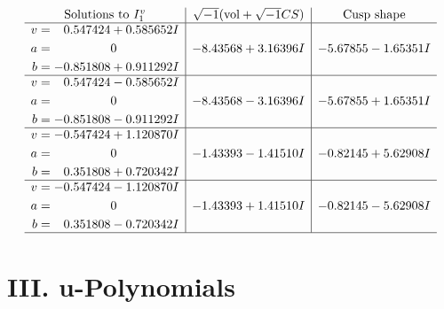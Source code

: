 \documentclass[1p]{elsarticle_modified}
\theoremstyle{definition}
\newcommand{\I}{\sqrt{-1}}
\begin{document}
$$\begin{array}{c|c|c}  
\text{Solutions to }I^v_{1}& \I (\text{vol} + \sqrt{-1}CS) & \text{Cusp shape}\\
 \hline 
\begin{aligned}
v &= \phantom{-}0.547424 + 0.585652 I \\
a &= \phantom{-0.000000 } 0 \\
b &= -0.851808 + 0.911292 I\end{aligned}
 & -8.43568 + 3.16396 I & -5.67855 - 1.65351 I \\ \hline\begin{aligned}
v &= \phantom{-}0.547424 - 0.585652 I \\
a &= \phantom{-0.000000 } 0 \\
b &= -0.851808 - 0.911292 I\end{aligned}
 & -8.43568 - 3.16396 I & -5.67855 + 1.65351 I \\ \hline\begin{aligned}
v &= -0.547424 + 1.120870 I \\
a &= \phantom{-0.000000 } 0 \\
b &= \phantom{-}0.351808 + 0.720342 I\end{aligned}
 & -1.43393 - 1.41510 I & -0.82145 + 5.62908 I \\ \hline\begin{aligned}
v &= -0.547424 - 1.120870 I \\
a &= \phantom{-0.000000 } 0 \\
b &= \phantom{-}0.351808 - 0.720342 I\end{aligned}
 & -1.43393 + 1.41510 I & -0.82145 - 5.62908 I\\
 \hline 
 \end{array}$$\newpage
\newpage\renewcommand{\arraystretch}{1}
\centering \section*{ III. u-Polynomials}
\end{document}
